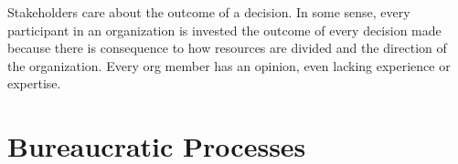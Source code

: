 \documentclass{book}
\begin{document}
    Stakeholders care about the outcome of a decision. 
    In some sense, every participant in an organization is invested the outcome of every decision made because there is consequence to how resources are divided and the direction of the organization. Every org member has an opinion, even lacking experience or expertise. 
    
     \clearpage
     \clearpage %
     \clearpage %
%    
    
     \clearpage %
     \clearpage %
     \clearpage %
%    
%    

  \chapter{Bureaucratic Processes\label{sec:process}}
  \minitoc
     \clearpage
     \clearpage
     \clearpage
     \clearpage
     \clearpage
     \clearpage
     \clearpage
     \clearpage
     \clearpage
     \clearpage
     \clearpage
     \clearpage %
     \clearpage
     \clearpage



\end{document}
